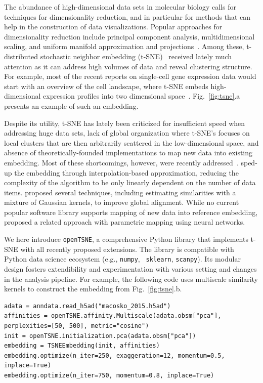 \documentclass{bioinfo}
\begin{document}
The abundance of high-dimensional data sets in molecular biology calls for
techniques for dimensionality reduction, and in particular for methods that can
help in the construction of data visualizations. Popular approaches for
dimensionality reduction include principal component analysis, multidimensional
scaling, and uniform manifold approximation and projections~\citep{}. Among
these, t-distributed stochastic neighbor embedding
(t-SNE)~\citep{tsne,review-tsne} received lately much attention as it can
address high volumes of data and reveal clustering structure. For example, most
of the recent reports on single-cell gene expression data would start with an
overview of the cell landscape, where t-SNE embeds high-dimensional expression
profiles into two dimensional space~\citep{Macosko2015, Shekhar2016,three}.
Fig.~\ref{fig:tsne}.a presents an example of such an embedding.

Despite its utility, t-SNE has lately been criticized for insufficient speed
when addressing huge data sets, lack of global organization where t-SNE's
focuses on local clusters that are then arbitrarily scattered in the
low-dimensional space, and absence of theoretically-founded implementations to
map new data into existing embedding. Most of these shortcomings, however, were
recently addressed~\citep{ding2018interpretable,becht2019dimensionality}.
\citet{fi_tsne} sped-up the embedding through interpolation-based
approximation, reducing the complexity of the algorithm to be only linearly
dependent on the number of data items. \citet{art_of_using_tsne} proposed
several techniques, including estimating similarities with a mixture of
Gaussian kernels, to improve global alignment. While no current popular
software library supports mapping of new data into reference embedding,
\citet{parametric_tsne} proposed a related approach with parametric mapping
using neural networks.

We here introduce {\tt openTSNE}, a comprehensive Python library that
implements t-SNE with all recently proposed extensions. The library is
compatible with Python data science ecosystem (e.g., {\tt numpy}, {\tt
sklearn}, {\tt scanpy}). Its modular design fosters extendibility and
experimentation with various setting and changes in the analysis pipeline. For
example, the following code uses multiscale similarity kernels to construct the
embedding from Fig.~\ref{fig:tsne}.b.

\begin{lstlisting}
adata = anndata.read_h5ad("macosko_2015.h5ad")
affinities = openTSNE.affinity.Multiscale(adata.obsm["pca"], perplexities=[50, 500], metric="cosine")
init = openTSNE.initialization.pca(adata.obsm["pca"])
embedding = TSNEEmbedding(init, affinities)
embedding.optimize(n_iter=250, exaggeration=12, momentum=0.5, inplace=True)
embedding.optimize(n_iter=750, momentum=0.8, inplace=True)
\end{lstlisting}
\end{document}
